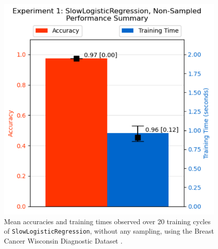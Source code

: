 \documentclass{article}
\theoremstyle{plain}
\theoremstyle{definition}
\theoremstyle{remark}
\begin{document}
\begin{figure}[ht]
\vskip 0.2in
\begin{center}
\centerline{\includegraphics[width=\columnwidth]{experiment_1b}}
\caption{Mean accuracies and training times observed over 20 training cycles of \texttt{SlowLogisticRegression}, without any sampling, using the Breast Cancer Wisconsin Diagnostic Dataset \cite{breastcancer}.}
\label{experiment_1a}
\end{center}
\vskip -0.2in
\end{figure}
\end{document}
